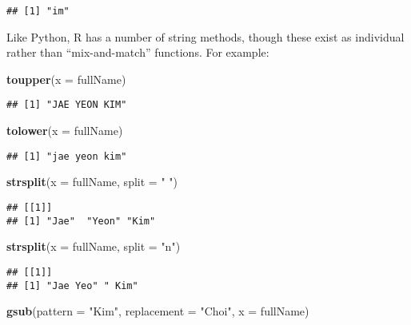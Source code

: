 \documentclass[
]{book}
\newenvironment{Shaded}{\begin{snugshade}}{\end{snugshade}}
\newcommand{\DataTypeTok}[1]{\textcolor[rgb]{0.13,0.29,0.53}{#1}}
\newcommand{\KeywordTok}[1]{\textcolor[rgb]{0.13,0.29,0.53}{\textbf{#1}}}
\newcommand{\NormalTok}[1]{#1}
\newcommand{\StringTok}[1]{\textcolor[rgb]{0.31,0.60,0.02}{#1}}
\begin{document}
\begin{verbatim}
## [1] "im"
\end{verbatim}

Like Python, R has a number of string methods, though these exist as individual rather than ``mix-and-match'' functions. For example:

\begin{Shaded}
\begin{Highlighting}[]
\KeywordTok{toupper}\NormalTok{(}\DataTypeTok{x =}\NormalTok{ fullName)}
\end{Highlighting}
\end{Shaded}

\begin{verbatim}
## [1] "JAE YEON KIM"
\end{verbatim}

\begin{Shaded}
\begin{Highlighting}[]
\KeywordTok{tolower}\NormalTok{(}\DataTypeTok{x =}\NormalTok{ fullName)}
\end{Highlighting}
\end{Shaded}

\begin{verbatim}
## [1] "jae yeon kim"
\end{verbatim}

\begin{Shaded}
\begin{Highlighting}[]
\KeywordTok{strsplit}\NormalTok{(}\DataTypeTok{x =}\NormalTok{ fullName, }\DataTypeTok{split =} \StringTok{" "}\NormalTok{)}
\end{Highlighting}
\end{Shaded}

\begin{verbatim}
## [[1]]
## [1] "Jae"  "Yeon" "Kim"
\end{verbatim}

\begin{Shaded}
\begin{Highlighting}[]
\KeywordTok{strsplit}\NormalTok{(}\DataTypeTok{x =}\NormalTok{ fullName, }\DataTypeTok{split =} \StringTok{"n"}\NormalTok{)}
\end{Highlighting}
\end{Shaded}

\begin{verbatim}
## [[1]]
## [1] "Jae Yeo" " Kim"
\end{verbatim}

\begin{Shaded}
\begin{Highlighting}[]
\KeywordTok{gsub}\NormalTok{(}\DataTypeTok{pattern =} \StringTok{"Kim"}\NormalTok{, }\DataTypeTok{replacement =} \StringTok{"Choi"}\NormalTok{, }\DataTypeTok{x =}\NormalTok{ fullName)}
\end{Highlighting}
\end{Shaded}
\end{document}
